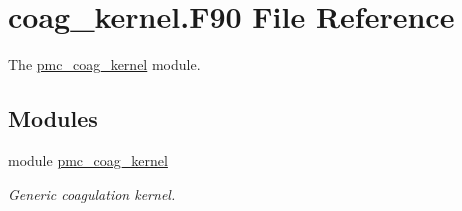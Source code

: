 \hypertarget{coag__kernel_8_f90}{}\section{coag\+\_\+kernel.\+F90 File Reference}
\label{coag__kernel_8_f90}


The \mbox{\hyperlink{namespacepmc__coag__kernel}{pmc\+\_\+coag\+\_\+kernel}} module.  


\subsection*{Modules}
\begin{DoxyCompactItemize}
\item 
module \mbox{\hyperlink{namespacepmc__coag__kernel}{pmc\+\_\+coag\+\_\+kernel}}
\begin{DoxyCompactList}\small\item\em Generic coagulation kernel. \end{DoxyCompactList}\end{DoxyCompactItemize}
